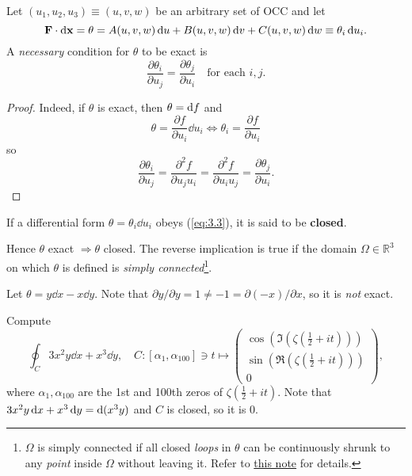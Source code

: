\begin{proposition}
    Let $(u_1, u_2, u_3) \equiv (u, v, w)$ be an arbitrary set of OCC and let
    \[
        \mathbf{F} \cdot \mathrm{d}{\bf x} = \theta = A(u, v, w) \,\mathrm{d} u + B(u, v, w) \,\mathrm{d} v + C(u, v, w) \,\mathrm{d} w \equiv \theta_i \,\mathrm{d} u_i.
    \]
    A \textit{necessary} condition for $ \theta $ to be exact is
    \begin{equation}\label{eq:3.3}\tag{$\dagger$}
        \frac{\partial \theta_i}{\partial u_j}= \frac{\partial \theta_j}{\partial u_i}\quad \text{for each }i,j.  
    \end{equation}
\end{proposition}
\begin{proof}
    Indeed, if $ \theta $ is exact, then $ \theta=\mathrm{d} f $ and 
    \[
        \theta = \frac{\partial f}{\partial u_i}\dd u_i \Longleftrightarrow \theta_i = \frac{\partial f}{\partial u_i}  
    \]
    so 
    \[
        \frac{\partial \theta_i}{\partial u_j}= \frac{\partial^2 f}{\partial u_j u_i} =   \frac{\partial^2 f}{\partial u_i u_j} = \frac{\partial \theta_j}{\partial u_i}.
    \]
\end{proof}
\begin{definition}
    If a differential form $ \theta = \theta_i\dd u_i $ obeys (\ref{eq:3.3}), it is said to be \textbf{closed}.
\end{definition}
Hence $ \theta $ exact $ \Rightarrow \theta $ closed. The reverse implication is true if the domain $ \Omega\in \mathbb{R}^{3} $ on which $ \theta $ is defined is \textit{simply connected}\footnote{$ \Omega $ is simply connected if all closed \textit{loops} in $ \theta $ can be continuously shrunk to any \textit{point} inside $ \Omega $ without leaving it. Refer to \href{https://www.mv.helsinki.fi/home/pankka/deRham2013}{this note} for details.}.

\begin{example}
    Let $ \theta=y\dd x-x\dd y $. Note that $ \partial y/\partial y=1\neq -1=\partial (-x)/\partial x   $, so it is \textit{not} exact. 
\end{example}

\begin{example}
    Compute 
    \[
        \oint_C 3x^2y\dd x+x^3\dd y,\quad C:[\alpha_1,\alpha_{100}] \ni t \mapsto \begin{pmatrix}
            \cos \left(\Im\left(\zeta\left(\frac{1}{2}+it\right)\right)\right) \\ \sin \left(\Re\left(\zeta\left(\frac{1}{2}+it\right)\right)\right)  \\ 0
        \end{pmatrix},
    \]
    where $ \alpha_1,\alpha_{100} $ are the 1st and 100th zeros of $ \zeta(\frac{1}{2}+it) $. Note that $ 3x^2y\,\mathrm{d} x+x^3\,\mathrm{d} y=\mathrm{d}(x^3y) $ and $C$ is closed, so it is 0.
\end{example}

